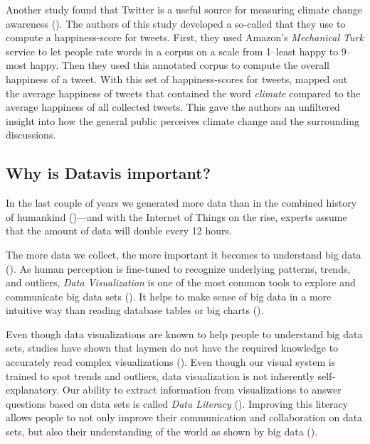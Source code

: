 Another study found that Twitter is a useful source for measuring climate change awareness (\cite{cody2015}). The authors of this study developed a so-called  that they use to compute a happiness-score for tweets. First, they used Amazon's \emph{Mechanical Turk} service to let people rate words in a corpus on a scale from 1--least happy to 9--most happy. Then they used this annotated corpus to compute the overall happiness of a tweet. With this set of happiness-scores for tweets, \citeauthor{cody2015} mapped out the average happiness of tweets that contained the word \emph{climate} compared to the average happiness of all collected tweets. This gave the authors an unfiltered insight into how the general public perceives climate change and the surrounding discussions.


\subsection{Why is Datavis important?}


In the last couple of years we generated more data than in the combined history of humankind (\cite{helbing2019will})---and with the Internet of Things on the rise, experts assume that the amount of data will double every 12 hours.

The more data we collect, %
the more important it becomes to understand big data (\cite{borner2019}). As human perception is fine-tuned to recognize underlying patterns, trends, and outliers, \emph{Data Visualization} is one of the most common tools to explore and communicate big data sets (\cite{heer2010}). It helps to make sense of big data in a more intuitive way than reading database tables or big charts (\cite{donalek2014}).

Even though data visualizations are known to help people to understand big data sets, studies have shown that laymen do not have the required knowledge to accurately read complex visualizations (\cite{borner2016}). %
Even though our visual system is trained to spot trends and outliers, data visualization is not inherently self-explanatory. Our ability to extract information from visualizations to answer questions based on data sets is called \emph{Data Literacy} (\cite{boy2014}). Improving this literacy allows people to not only improve their communication and collaboration on data sets, but also their understanding of the world as shown by big data (\cite{borner2019}). 
